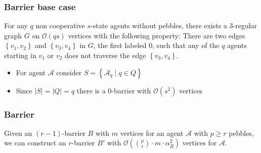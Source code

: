 \documentclass{beamer}
\begin{document}
\begin{frame}
  \frametitle{Barrier base case}
  \begin{mdframed}
    \begin{theorem}[Fraigniaud et al.]
      For any $q$ non cooperative $s$-state agents without pebbles, there
      exists a $3$-regular graph $G$ on $\mathcal{O}(qs)$ vertices with the
      following property: There are two edges $\left\{v_{1},v_{2}\right\}$
      and $\left\{v_{3},v_{4}\right\}$ in $G$, the first labeled 0, such
      that any of the $q$ agents starting in $v_{1}$ or $v_{2}$ does not
      traverse the edge $\left\{v_{3},v_{4}\right\}$.
    \end{theorem}
  \end{mdframed}
  \begin{itemize}
    \item For agent $\mathcal{A}$ consider
      $S = \left\{\mathcal{A}_{q}\mid q\in Q\right\}$
    \item Since $|S| = |Q| = q$ there is a 0-barrier with $\mathcal{O}(s^{2})$
      vertices
  \end{itemize}
\end{frame}

\begin{frame}
  \frametitle{Barrier}
  \begin{mdframed}
    \begin{theorem}
      Given an $(r-1)$-barrier $B$ with $m$ vertices for an agent $\mathcal{A}$
      with $p\geq r$ pebbles, we can construct an $r$-barrier $B'$ with
      $\mathcal{O}(\binom{p}{r}\cdot m\cdot\alpha_{B}^{2})$ vertices for
      $\mathcal{A}$.
    \end{theorem}
  \end{mdframed}
  \begin{center}
    \resizebox{0.7\textwidth}{!}{}
  \end{center}
\end{frame}
\end{document}
